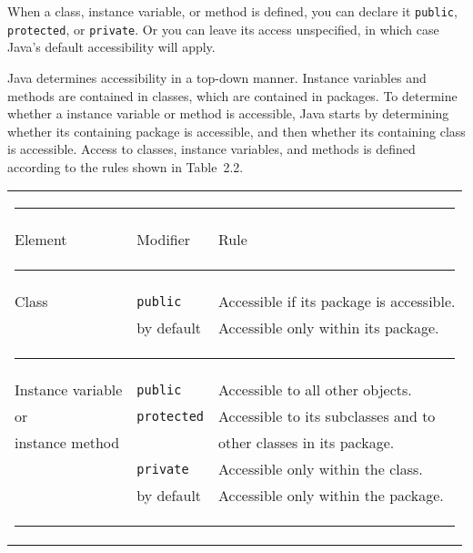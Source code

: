 \noindent When a class, instance variable, or method is defined, you 
can declare it {\tt public}, {\tt protected}, or {\tt private}. Or you
can leave its access unspecified, in which case Java's default
accessibility will apply.

Java determines accessibility in a top-down manner. Instance variables
and methods are contained in classes, which are contained in packages.
To determine whether a instance variable or method is accessible, Java
starts by determining whether its containing package is accessible,
and then whether its containing class is accessible. Access to
classes, instance variables, and methods is defined according to the
rules shown in Table~2.2.

\begin{table}[htb]
\vspace{6pt}
\hspace*{-0.5pc}\begin{tabular}{lll}
\multicolumn{3}{l}{\color{cyan}\rule{27pc}{1pt}}\\[2pt]
{Element}                   & {Modifier}        & {Rule}
\\[-4pt]\multicolumn{3}{l}{\color{cyan}\rule{27pc}{0.5pt}}\\[2pt]
Class                       & {\tt public}      & Accessible if its package is accessible. \\
                            & by default        & Accessible only within its package.
\\[-4pt]\multicolumn{3}{l}{\color{cyan}\rule{27pc}{0.5pt}}\\[2pt]
Instance variable           & {\tt public}      & Accessible to all other objects.          \\
\quad or                    & {\tt protected}   & Accessible to its subclasses and to       \\
\quad instance method       &                   & \quad  other classes in its package.      \\
                            & {\tt private}     & Accessible only within the class.         \\
                            & by default        & Accessible only within the package.
\\[-4pt]\multicolumn{3}{l}{\color{cyan}\rule{27pc}{1pt}}
\end{tabular}
\endTB
\vspace{-6pt}\end{table}

